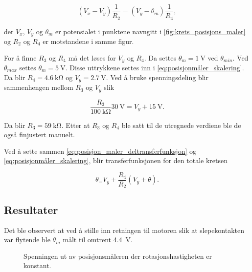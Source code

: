 \begin{equation}
    \label{eq:posisjonmåler_skalering}
    (V_x - V_y) \frac{1}{R_2} = (V_y - \theta_m) \frac{1}{R_4},
\end{equation}

der $V_x$, $V_y$ og $\theta_m$ er potensialet i punktene navngitt i \autoref{fig:krets_posisjons_maler} og $R_2$ og $R_4$ er motstandene i samme figur.

For å finne $R_3$ og $R_4$ må det løses for $V_y$ og $R_4$.
Da settes $\theta_m = \SI{1}{\volt}$ ved $\theta_{min}$.
Ved $\theta_{max}$ settes $\theta_m = \SI{5}{\volt}$.
Disse uttrykkene settes inn i \eqref{eq:posisjonmåler_skalering}. 
Da blir $R_4 = \SI{4.6}{\kilo\ohm}$ og 
$V_y = \SI{2.7}{\volt}$.
Ved å bruke spenningsdeling blir sammenhengen mellom $R_3$ og $V_y$ slik

\begin{equation}
    \label{eq:posisjon_maler_R3}
    \frac{R_3}{\SI{100}{\kilo\ohm}} \SI{30}{\volt} = V_y + \SI{15}{\volt}.
\end{equation}

Da blir $R_3 = \SI{59}{\kilo\ohm}$. Etter at $R_3$ og $R_4$ ble satt til de utregnede verdiene ble de også finjustert manuelt.

Ved å sette sammen \eqref{eq:posisjon_maler_deltransferfunksjon} og \eqref{eq:posisjonmåler_skalering}, blir transferfunksjonen for den totale kretsen

\begin{equation}
    \label{eq:posisjon_maling_transferfuksjon}
    \theta_ = V_y + \frac{R_4}{R_2}(V_y + \theta).
\end{equation}






\subsection{Resultater}

\label{obs:floating_potensiometer}
Det ble observert at ved å stille inn retningen til motoren slik at slepekontakten var flytende ble $\theta_m$ målt til omtrent \SI{4.4}{\volt}.

\begin{figure}[h]
    \centering
    
    \caption{Spenningen ut av posisjonsmåleren der rotasjonshastigheten er konstant.}
    \label{fig:posisjon_sagtann}
\end{figure}






